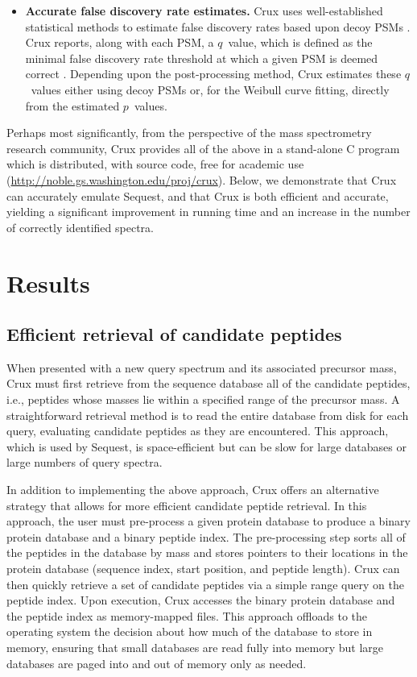 \documentclass[12pt]{article}
\begin{document}
\begin{itemize}
\item {\bf Accurate false discovery rate estimates.}  Crux uses
  well-established statistical methods to estimate false discovery
  rates based upon decoy PSMs \cite{benjamini:controlling}.  Crux
  reports, along with each PSM, a $q$~value, which is defined as the
  minimal false discovery rate threshold at which a given PSM is
  deemed correct \cite{storey:statistical}.  Depending upon the
  post-processing method, Crux estimates these $q$~values either using
  decoy PSMs or, for the Weibull curve fitting, directly from the
  estimated $p$~values.

\end{itemize}

Perhaps most significantly, from the perspective of the mass
spectrometry research community, Crux provides all of the above in a
stand-alone C program which is distributed, with source code, free for
academic use (\url{http://noble.gs.washington.edu/proj/crux}).  Below,
we demonstrate that Crux can accurately emulate {\sc Sequest}, and
that Crux is both efficient and accurate, yielding a significant
improvement in running time and an increase in the number of correctly
identified spectra.

\section{Results}

\subsection{Efficient retrieval of candidate peptides}

When presented with a new query spectrum and its associated precursor
mass, Crux must first retrieve from the sequence database all of the
candidate peptides, i.e., peptides whose masses lie within a specified
range of the precursor mass.  A straightforward retrieval method is to
read the entire database from disk for each query, evaluating
candidate peptides as they are encountered.  This approach, which is
used by {\sc Sequest}, is space-efficient but can be slow for large
databases or large numbers of query spectra.

In addition to implementing the above approach, Crux offers an
alternative strategy that allows for more efficient candidate peptide
retrieval.  In this approach, the user must pre-process a given
protein database to produce a binary protein database and a binary
peptide index.  The pre-processing step sorts all of the peptides in
the database by mass and stores pointers to their locations in the
protein database (sequence index, start position, and peptide length).
Crux can then quickly retrieve a set of candidate peptides via a
simple range query on the peptide index.  Upon execution, Crux
accesses the binary protein database and the peptide index as
memory-mapped files.  This approach offloads to the operating system
the decision about how much of the database to store in memory,
ensuring that small databases are read fully into memory but large
databases are paged into and out of memory only as needed.
\end{document}
